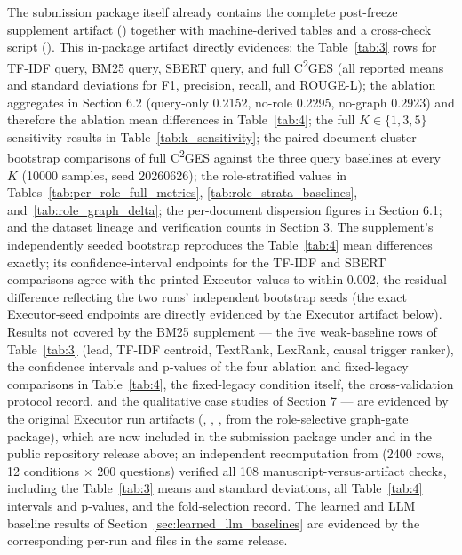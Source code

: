 \documentclass{ieeeaccess}
\begin{document}
The submission package itself already contains the complete post-freeze supplement artifact () together with machine-derived tables and a cross-check script (). This in-package artifact directly evidences: the Table~\ref{tab:3} rows for TF-IDF query, BM25 query, SBERT query, and full C\textsuperscript{2}GES (all reported means and standard deviations for F1, precision, recall, and ROUGE-L); the ablation aggregates in Section 6.2 (query-only 0.2152, no-role 0.2295, no-graph 0.2923) and therefore the ablation mean differences in Table~\ref{tab:4}; the full \(K\in\{1,3,5\}\) sensitivity results in Table~\ref{tab:k_sensitivity}; the paired document-cluster bootstrap comparisons of full C\textsuperscript{2}GES against the three query baselines at every \(K\) (10000 samples, seed 20260626); the role-stratified values in Tables~\ref{tab:per_role_full_metrics}, \ref{tab:role_strata_baselines}, and~\ref{tab:role_graph_delta}; the per-document dispersion figures in Section 6.1; and the dataset lineage and verification counts in Section 3. The supplement's independently seeded bootstrap reproduces the Table~\ref{tab:4} mean differences exactly; its confidence-interval endpoints for the TF-IDF and SBERT comparisons agree with the printed Executor values to within 0.002, the residual difference reflecting the two runs' independent bootstrap seeds (the exact Executor-seed endpoints are directly evidenced by the Executor artifact below). Results not covered by the BM25 supplement --- the five weak-baseline rows of Table~\ref{tab:3} (lead, TF-IDF centroid, TextRank, LexRank, causal trigger ranker), the confidence intervals and p-values of the four ablation and fixed-legacy comparisons in Table~\ref{tab:4}, the fixed-legacy condition itself, the cross-validation protocol record, and the qualitative case studies of Section 7 --- are evidenced by the original Executor run artifacts (, , ,  from the role-selective graph-gate package), which are now included in the submission package under  and in the public repository release above; an independent recomputation from  (2400 rows, 12 conditions \(\times\) 200 questions) verified all 108 manuscript-versus-artifact checks, including the Table~\ref{tab:3} means and standard deviations, all Table~\ref{tab:4} intervals and p-values, and the  fold-selection record. The learned and LLM baseline results of Section~\ref{sec:learned_llm_baselines} are evidenced by the corresponding per-run  and  files in the same release.
\end{document}
